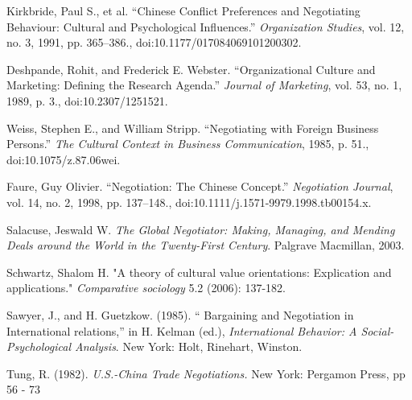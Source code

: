 \documentclass[../main.tex]{subfiles}
\begin{document}
\begin{thebibliography}{9}

 Kirkbride, Paul S., et al. “Chinese Conflict Preferences and Negotiating Behaviour: Cultural and Psychological Influences.” \textit{Organization Studies}, vol. 12, no. 3, 1991, pp. 365–386., doi:10.1177/017084069101200302.

 Deshpande, Rohit, and Frederick E. Webster. “Organizational Culture and Marketing: Defining the Research Agenda.” \textit{Journal of Marketing}, vol. 53, no. 1, 1989, p. 3., doi:10.2307/1251521.

 Weiss, Stephen E., and William Stripp. “Negotiating with Foreign Business Persons.” \textit{The Cultural Context in Business Communication}, 1985, p. 51., doi:10.1075/z.87.06wei.

 Faure, Guy Olivier. “Negotiation: The Chinese Concept.” \textit{Negotiation Journal}, vol. 14, no. 2, 1998, pp. 137–148., doi:10.1111/j.1571-9979.1998.tb00154.x.

 Salacuse, Jeswald W. \textit{The Global Negotiator: Making, Managing, and Mending Deals around the World in the Twenty-First Century}. Palgrave Macmillan, 2003.

 Schwartz, Shalom H. "A theory of cultural value orientations: Explication and applications." \textit{Comparative sociology} 5.2 (2006): 137-182.

 Sawyer, J., and H. Guetzkow. (1985). “ Bargaining and Negotiation in International relations,” in H. Kelman (ed.), \textit{International Behavior: A Social-Psychological Analysis}. New York: Holt, Rinehart, Winston.

 Tung, R. (1982). \textit{U.S.-China Trade Negotiations.} New York: Pergamon Press, pp 56 - 73



\end{thebibliography}
\end{document}
